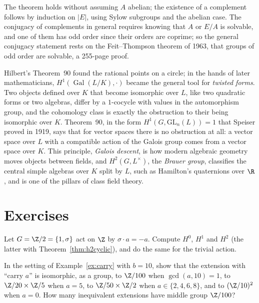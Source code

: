 The theorem holds without assuming $A$ abelian; the existence of a complement follows by induction on $|E|$, using Sylow subgroups and the abelian case. The conjugacy of complements in general requires knowing that $A$ or
$E/A$ is solvable, and one of them has odd order since their orders are coprime; so the general conjugacy statement rests on the Feit--Thompson theorem of 1963, that groups of odd order are solvable, a 255-page proof.

\begin{beauty}
Hilbert's Theorem~90 found the rational points on a circle; in the hands of later mathematicians, $H^1(\operatorname{Gal}(L/K),\cdot)$ became the general tool for \emph{twisted forms}. Two objects defined over $K$ that become
isomorphic over $L$, like two quadratic forms or two algebras, differ by a $1$-cocycle with values in the automorphism group, and the cohomology class is exactly the obstruction to their being isomorphic over $K$. Theorem~90, in the form $H^1(G,\mathrm{GL}_n(L))=1$ that Speiser proved in 1919, says
that for vector spaces there is no obstruction at all: a vector space over $L$ with a compatible action of the Galois group comes from a vector space over $K$. This principle, \emph{Galois descent}, is how modern algebraic
geometry moves objects between fields, and $H^2(G,L^\times)$, the \emph{Brauer group}, classifies the central simple algebras over $K$ split by $L$, such as Hamilton's quaternions over $\R$, and is one of the pillars of class field theory.
\end{beauty}

\section{Exercises}

\begin{exercise}[$\star$]\label{ex:h1sign}
Let $G=\Z/2=\{1,\sigma\}$ act on $\Z$ by $\sigma\cdot a=-a$. Compute $H^0$, $H^1$ and $H^2$ (the latter with Theorem~\ref{thm:h2cyclic}), and do the same for the trivial action.
\end{exercise}

\begin{exercise}[$\star$]\label{ex:carry10}
In the setting of Example~\ref{ex:carry} with $b=10$, show that the extension with ``carry $a$'' is isomorphic, as a group, to $\Z/100$ when $\gcd(a,10)=1$, to $\Z/20\times\Z/5$ when $a=5$, to $\Z/50\times\Z/2$ when $a\in\{2,4,6,8\}$, and to
$(\Z/10)^2$ when $a=0$. How many inequivalent extensions have middle group $\Z/100$?
\end{exercise}

